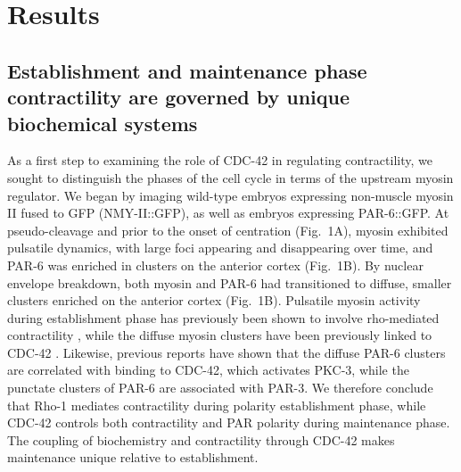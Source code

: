 \documentclass[11pt]{article}
\newcommand{\6}[1]{#1_{\text{6}}}
\newcommand{\3}[1]{#1_{\text{3}}}
\begin{document}
\section*{Results}

\subsection*{Establishment and maintenance phase contractility are governed by unique biochemical systems}

As a first step to examining the role of CDC-42 in regulating contractility, we sought to distinguish the phases of the cell cycle in terms of the upstream myosin regulator. We began by imaging wild-type embryos expressing non-muscle myosin II fused to GFP (NMY-II::GFP), as well as embryos expressing PAR-6::GFP. At pseudo-cleavage and prior to the onset of centration (Fig.\ 1A), myosin exhibited pulsatile dynamics, with large foci appearing and disappearing over time, and PAR-6 was enriched in clusters on the anterior cortex (Fig.\ 1B). By nuclear envelope breakdown, both myosin and PAR-6 had transitioned to diffuse, smaller clusters enriched on the anterior cortex (Fig.\ 1B). Pulsatile myosin activity during establishment phase has previously been shown to involve rho-mediated contractility \citep{michaux2018excitable, michaud2022versatile, yao2022modulating}, while the diffuse myosin clusters have been previously linked to CDC-42 \citep{motegi2006sequential}. Likewise, previous reports \citep{motegi2006sequential, rodriguez2017apkc} have shown that the diffuse PAR-6 clusters are correlated with binding to CDC-42, which activates PKC-3, while the punctate clusters of PAR-6 are associated with PAR-3. We therefore conclude that Rho-1 mediates contractility during polarity establishment phase, while CDC-42 controls both contractility and PAR polarity during maintenance phase. The coupling of biochemistry and contractility through CDC-42 makes maintenance unique relative to establishment.
\end{document}
